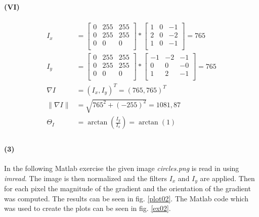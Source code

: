 \documentclass[a4paper]{article}
\begin{document}
\paragraph{(VI)}
\begin{align*}
    I_x &= \begin{bmatrix}
        0 & 255 & 255\\
        0 & 255 & 255\\
        0 & 0 & 0\\
        \end{bmatrix}
         * 
         \begin{bmatrix}
        1 & 0 & -1\\
        2 & 0 & -2\\
        1 & 0 & -1\\
        \end{bmatrix}
        = 765\\
        I_y &= \begin{bmatrix}
        0 & 255 & 255\\
        0 & 255 & 255\\
        0 & 0 & 0\\
        \end{bmatrix}
         * 
         \begin{bmatrix}
        -1 & -2 & -1\\
        0 & 0 & -0\\
        1 & 2 & -1\\
        \end{bmatrix}
        = 765\\
        \nabla I &= (I_x,I_y)^T = (765,765)^T\\
        \| \nabla I\| &= \sqrt{765^2+(-255)^2} = 1081,87\\
        \Theta_I &= \operatorname{arctan}(\frac{I_y}{I_x}) = \operatorname{arctan}(1)\\
\end{align*}

\paragraph{(3)}
In the following Matlab exercise the given image \textit{circles.png} is read in using \textit{imread}. The image is then normalized and the filters $I_x$ and $I_y$ are applied. Then for each pixel the magnitude of the gradient and the orientation of the gradient was computed. The results can be seen in fig. \ref{plot02}. The Matlab code which was used to create the plots can be seen in fig. \ref{ex02}.
\end{document}
